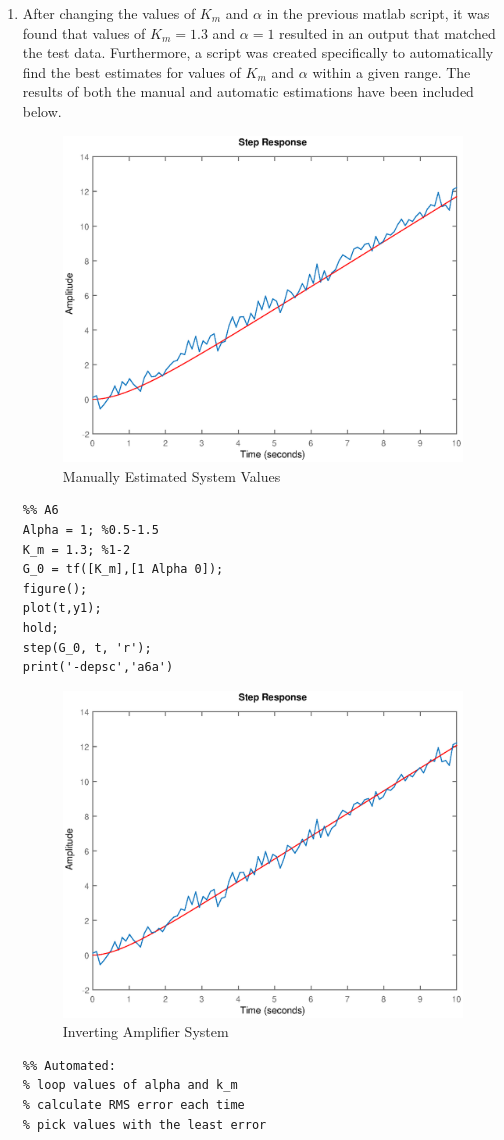\documentclass[11pt,a4paper]{article}
\begin{document}
\begin{enumerate}
    
    \pagebreak
    \item After changing the values of $K_m$ and $\alpha$ in the previous matlab script, it was found that values of $K_m = 1.3$ and $\alpha = 1$ resulted in an output that matched the test data. Furthermore, a script was created specifically to automatically find the best estimates for values of $K_m$ and $\alpha$ within a given range. The results of both the manual and automatic estimations have been included below. 
    \begin{figure}[H]
	\centering
	\includegraphics[width=.8\textwidth]{PreLach/a6a.eps}
	\caption{\label{fig:manest}Manually Estimated System Values}
	\end{figure}
    \begin{lstlisting}
%% A6
Alpha = 1; %0.5-1.5
K_m = 1.3; %1-2
G_0 = tf([K_m],[1 Alpha 0]);
figure();
plot(t,y1);
hold;
step(G_0, t, 'r');
print('-depsc','a6a')
	\end{lstlisting}
    
    \begin{figure}[H]
	\centering
	\includegraphics[width=.8\textwidth]{PreLach/a6b.eps}
	\caption{\label{fig:autoest}Inverting Amplifier System}
	\end{figure}
    \begin{lstlisting}
%% Automated:
% loop values of alpha and k_m
% calculate RMS error each time
% pick values with the least error


\end{lstlisting}
\end{enumerate}
\end{document}
